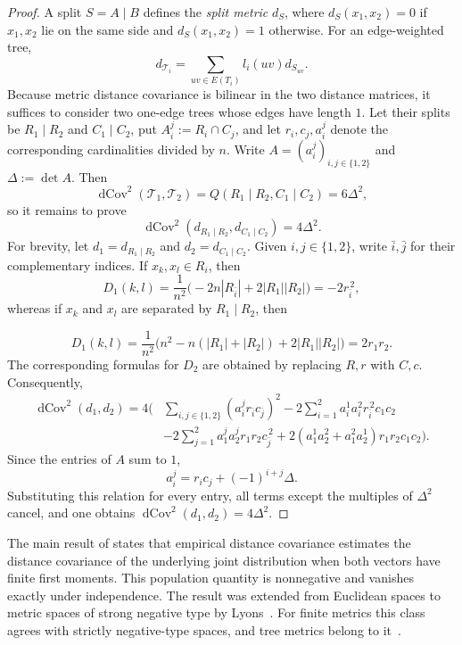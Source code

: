 \documentclass[pdflatex,sn-mathphys-num]{sn-jnl}
\theoremstyle{thmstyleone}
\DeclareMathOperator{\dCov}{dCov}
\begin{document}
\begin{proof}
A split $S=A\mid B$ defines the \emph{split metric} $d_S$, where
$d_S(x_1,x_2)=0$ if $x_1,x_2$ lie on the same side and $d_S(x_1,x_2)=1$
otherwise.  For an edge-weighted tree,
\[
d_{\mathcal T_i}=\sum_{uv\in E(T_i)}l_i(uv)d_{S_{uv}}.
\]
Because metric distance covariance is bilinear in the two distance
matrices, it suffices to consider two one-edge trees whose edges have
length $1$.  Let their splits be $R_1\mid R_2$ and $C_1\mid C_2$, put
$A_i^j:=R_i\cap C_j$, and let $r_i,c_j,a_i^j$ denote the corresponding
cardinalities divided by $n$.  Write $A=(a_i^j)_{i,j\in\{1,2\}}$ and
$\Delta:=\det A$.
Then
\[
\dCov^2(\mathcal T_1,\mathcal T_2)
=Q(R_1\mid R_2,C_1\mid C_2)=6\Delta^2,
\]
so it remains to prove
\[
\dCov^2(d_{R_1\mid R_2},d_{C_1\mid C_2})=4\Delta^2.
\]
For brevity, let $d_1=d_{R_1\mid R_2}$ and
$d_2=d_{C_1\mid C_2}$.  Given $i,j\in\{1,2\}$, write $\bar i,\bar j$
for their complementary indices.  If $x_k,x_l\in R_i$, then
\[
D_1(k,l)=\frac1{n^2}
\bigl(-2n|R_{\bar i}|+2|R_1||R_2|\bigr)=-2r_{\bar i}^{\,2},
\]
whereas if $x_k$ and $x_l$ are separated by $R_1\mid R_2$, then

\[
D_1(k,l)=\frac1{n^2}
\bigl(n^2-n(|R_1|+|R_2|)+2|R_1||R_2|\bigr)=2r_1r_2.
\]
The corresponding formulas for $D_2$ are obtained by replacing $R,r$
with $C,c$.  Consequently,
\begin{align*}
\dCov^2(d_1,d_2)=4\Biggl(&
\sum_{i,j\in\{1,2\}}(a_i^j r_{\bar i}c_{\bar j})^2
-2\sum_{i=1}^2a_i^1a_i^2r_{\bar i}^{\,2}c_1c_2\\
&-2\sum_{j=1}^2a_1^ja_2^jr_1r_2c_{\bar j}^{\,2}
+2(a_1^1a_2^2+a_1^2a_2^1)r_1r_2c_1c_2\Biggr).
\end{align*}
Since the entries of $A$ sum to $1$,
\[
a_i^j=r_ic_j+(-1)^{i+j}\Delta.
\]
Substituting this relation for every entry, all terms except the
multiples of $\Delta^2$ cancel, and one obtains
$\dCov^2(d_1,d_2)=4\Delta^2$.
\end{proof}

The main result of \cite{SzekelyRizzoBakirov2007} states that empirical
distance covariance estimates the distance covariance of the underlying
joint distribution when both vectors have finite first moments.  This
population quantity is nonnegative and vanishes exactly under
independence.  The result was extended from Euclidean spaces to metric
spaces of strong negative type by Lyons~\cite{Lyons2013}.  For finite
metrics this class agrees with strictly negative-type spaces, and tree
metrics belong to it~\cite{HjorthEtAl1998}.
\end{document}
